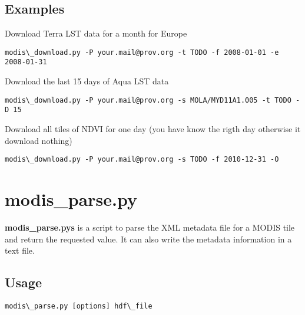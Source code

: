 \documentclass[a4paper,11pt,oneside]{sphinxmanual}
\begin{document}
\subsection{Examples}
\label{scripts/modis_download:examples}
Download Terra LST data for a month for Europe

\begin{Verbatim}[commandchars=\\\{\}]
modis\_download.py -P your.mail@prov.org -t TODO -f 2008-01-01 -e 2008-01-31
\end{Verbatim}

Download the last 15 days of Aqua LST data

\begin{Verbatim}[commandchars=\\\{\}]
modis\_download.py -P your.mail@prov.org -s MOLA/MYD11A1.005 -t TODO -D 15
\end{Verbatim}

Download all tiles of NDVI for one day (you have know the rigth day otherwise it download nothing)

\begin{Verbatim}[commandchars=\\\{\}]
modis\_download.py -P your.mail@prov.org -s TODO -f 2010-12-31 -O
\end{Verbatim}
\newpage %

\section{modis\_parse.py}
\label{scripts/modis_parse:modis-parse-py}\label{scripts/modis_parse::doc}
\textbf{modis\_parse.pys} is a script to parse the XML metadata file for a MODIS
tile and return the requested value. It can also write the metadata information
in a text file.


\subsection{Usage}
\label{scripts/modis_parse:usage}
\begin{Verbatim}[commandchars=\\\{\}]
modis\_parse.py [options] hdf\_file
\end{Verbatim}
\end{document}
